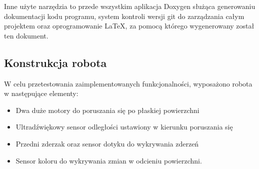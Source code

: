 Inne użyte narzędzia to przede wszystkim aplikacja Doxygen służąca generowaniu dokumentacji kodu programu, system kontroli wersji \gls{git} do zarządzania całym projektem oraz oprogramowanie LaTeX, za pomocą którego wygenerowany został ten dokument.

\subsection{Konstrukcja robota}
W celu przetestowania zaimplementowanych funkcjonalności, wyposażono robota w następujące elementy:
\begin{itemize}
    \item Dwa duże motory do poruszania się po płaskiej powierzchni
    \item Ultradźwiękowy sensor odległości ustawiony w kierunku poruszania się
    \item Przedni zderzak oraz sensor dotyku do wykrywania zderzeń
    \item Sensor koloru do wykrywania zmian w odcieniu powierzchni.
\end{itemize}
